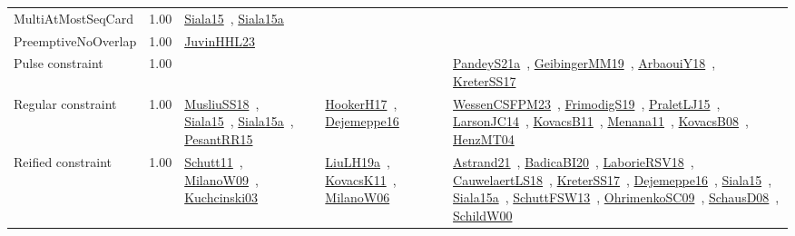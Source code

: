 {\begin{longtable}{p{3cm}r>{\raggedright\arraybackslash}p{6cm}>{\raggedright\arraybackslash}p{6cm}>{\raggedright\arraybackslash}p{8cm}}
\index{MultiAtMostSeqCard}\index{Constraints!MultiAtMostSeqCard}MultiAtMostSeqCard &  1.00 & \href{../works/Siala15.pdf}{Siala15}~\cite{Siala15}, \href{../works/Siala15a.pdf}{Siala15a}~\cite{Siala15a} &  & \\
\index{PreemptiveNoOverlap}\index{Constraints!PreemptiveNoOverlap}PreemptiveNoOverlap &  1.00 & \href{../works/JuvinHHL23.pdf}{JuvinHHL23}~\cite{JuvinHHL23} &  & \\
\index{Pulse constraint}\index{Constraints!Pulse constraint}Pulse constraint &  1.00 &  &  & \href{../works/PandeyS21a.pdf}{PandeyS21a}~\cite{PandeyS21a}, \href{../works/GeibingerMM19.pdf}{GeibingerMM19}~\cite{GeibingerMM19}, \href{../works/ArbaouiY18.pdf}{ArbaouiY18}~\cite{ArbaouiY18}, \href{../works/KreterSS17.pdf}{KreterSS17}~\cite{KreterSS17}\\
\index{Regular constraint}\index{Constraints!Regular constraint}Regular constraint &  1.00 & \href{../works/MusliuSS18.pdf}{MusliuSS18}~\cite{MusliuSS18}, \href{../works/Siala15.pdf}{Siala15}~\cite{Siala15}, \href{../works/Siala15a.pdf}{Siala15a}~\cite{Siala15a}, \href{../works/PesantRR15.pdf}{PesantRR15}~\cite{PesantRR15} & \href{../works/HookerH17.pdf}{HookerH17}~\cite{HookerH17}, \href{../works/Dejemeppe16.pdf}{Dejemeppe16}~\cite{Dejemeppe16} & \href{../works/WessenCSFPM23.pdf}{WessenCSFPM23}~\cite{WessenCSFPM23}, \href{../works/FrimodigS19.pdf}{FrimodigS19}~\cite{FrimodigS19}, \href{../works/PraletLJ15.pdf}{PraletLJ15}~\cite{PraletLJ15}, \href{../works/LarsonJC14.pdf}{LarsonJC14}~\cite{LarsonJC14}, \href{../works/KovacsB11.pdf}{KovacsB11}~\cite{KovacsB11}, \href{../works/Menana11.pdf}{Menana11}~\cite{Menana11}, \href{../works/KovacsB08.pdf}{KovacsB08}~\cite{KovacsB08}, \href{../works/HenzMT04.pdf}{HenzMT04}~\cite{HenzMT04}\\
\index{Reified constraint}\index{Constraints!Reified constraint}Reified constraint &  1.00 & \href{../works/Schutt11.pdf}{Schutt11}~\cite{Schutt11}, \href{../works/MilanoW09.pdf}{MilanoW09}~\cite{MilanoW09}, \href{../works/Kuchcinski03.pdf}{Kuchcinski03}~\cite{Kuchcinski03} & \href{../works/LiuLH19a.pdf}{LiuLH19a}~\cite{LiuLH19a}, \href{../works/KovacsK11.pdf}{KovacsK11}~\cite{KovacsK11}, \href{../works/MilanoW06.pdf}{MilanoW06}~\cite{MilanoW06} & \href{../works/Astrand21.pdf}{Astrand21}~\cite{Astrand21}, \href{../works/BadicaBI20.pdf}{BadicaBI20}~\cite{BadicaBI20}, \href{../works/LaborieRSV18.pdf}{LaborieRSV18}~\cite{LaborieRSV18}, \href{../works/CauwelaertLS18.pdf}{CauwelaertLS18}~\cite{CauwelaertLS18}, \href{../works/KreterSS17.pdf}{KreterSS17}~\cite{KreterSS17}, \href{../works/Dejemeppe16.pdf}{Dejemeppe16}~\cite{Dejemeppe16}, \href{../works/Siala15.pdf}{Siala15}~\cite{Siala15}, \href{../works/Siala15a.pdf}{Siala15a}~\cite{Siala15a}, \href{../works/SchuttFSW13.pdf}{SchuttFSW13}~\cite{SchuttFSW13}, \href{../works/OhrimenkoSC09.pdf}{OhrimenkoSC09}~\cite{OhrimenkoSC09}, \href{../works/SchausD08.pdf}{SchausD08}~\cite{SchausD08}, \href{../works/SchildW00.pdf}{SchildW00}~\cite{SchildW00}\\

\end{longtable}}
